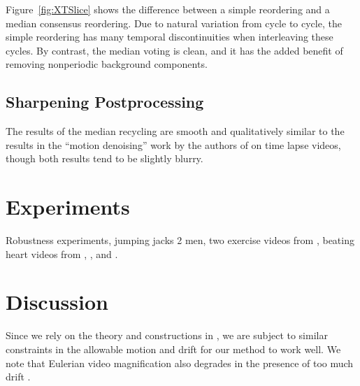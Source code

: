 \documentclass{article}
\begin{document}
Figure~\ref{fig:XTSlice} shows the difference between a simple reordering and a median consensus reordering.  Due to natural variation from cycle to cycle, the simple reordering has many temporal discontinuities when interleaving these cycles.  By contrast, the median voting is clean, and it has the added benefit of removing nonperiodic background components.


\subsection{Sharpening Postprocessing}

The results of the median recycling are smooth and qualitatively similar to the results in the ``motion denoising'' work by the authors of \cite{rubinstein2011motion} on time lapse videos, though both results tend to be slightly blurry.


\section{Experiments}

Robustness experiments, jumping jacks 2 men, two exercise videos from \cite{levy2015live}, beating heart videos from \cite{traliehigh}, \cite{wu2012eulerian}, and \cite{wadhwa2013phase}.


\section{Discussion}

Since we rely on the theory and constructions in \cite{tralie2017quasi}, we are subject to similar constraints in the allowable motion and drift for our method to work well.  We note that Eulerian video magnification also degrades in the presence of too much drift \cite{wu2012eulerian, wadhwa2013phase}.




\end{document}
